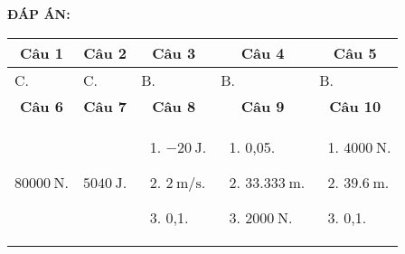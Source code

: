 \textbf{ĐÁP ÁN:}
\begin{longtable}[\textwidth]{|m{}|m{}|m{}|m{}|m{}|}
	\hline%
	\multicolumn{1}{|c}{\textbf{Câu 1}} &
	\multicolumn{1}{|c|}{\textbf{Câu 2}}& 
	\multicolumn{1}{c|}{\textbf{Câu 3}} &
	\multicolumn{1}{c|}{\textbf{Câu 4}} &
	\multicolumn{1}{c|}{\textbf{Câu 5}}   \\
	\hline
	C. &
	C. &
	B. &
	B. &
	B. \\
	\hline
	\multicolumn{1}{|c}{\textbf{Câu 6}} &
	\multicolumn{1}{|c|}{\textbf{Câu 7}}&  
	\multicolumn{1}{c|}{\textbf{Câu 8}} &
	\multicolumn{1}{c|}{\textbf{Câu 9}} &
	\multicolumn{1}{c|}{\textbf{Câu 10}} \\
	\hline
	$\SI{80000}{\newton}$. &
	$\SI{5040}{\joule}$. &
	\begin{enumerate}[label=\alph*)]
		\item $\SI{-20}{\joule}$.
		\item $\SI{2}{\meter/\second}$.
		\item 0,1.
	\end{enumerate} &
	\begin{enumerate}[label=\alph*)]
		\item 0,05.
		\item $\SI{33,333}{\meter}$.
		\item $\SI{2000}{\newton}$.
	\end{enumerate} &
	\begin{enumerate}[label=\alph*)]
		\item $\SI{4000}{\newton}$.
		\item $\SI{39,6}{\meter}$.
		\item 0,1.
	\end{enumerate}\\
	\hline
\end{longtable}


